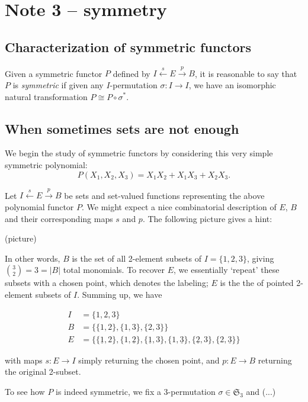 
\section{Note 3 -- symmetry}

\subsection{Characterization of symmetric functors}

Given a symmetric functor $P$ defined by $I \overset{s}{\gets} E \overset{p}{\to} B$, it is reasonable to say that $P$ is \emph{symmetric} if given any $I$-permutation $\sigma:I\to I$, we have an isomorphic natural transformation $P \cong P\circ \sigma^*$.

\subsection{When sometimes sets are not enough}

We begin the study of symmetric functors by considering this very simple symmetric polynomial:
\[
P(X_1,X_2,X_3) = X_1X_2 + X_1X_3 + X_2X_3.
\]

Let $I \overset{s}{\gets} E \overset{p}{\to} B$ be sets and set-valued functions representing the above polynomial functor $P$. We might expect a nice combinatorial description of $E$, $B$ and their corresponding maps $s$ and $p$. The following picture gives a hint:

(picture)

In other words, $B$ is the set of all 2-element subsets of $I=\{1,2,3\}$, giving $\binom{3}{2}=3=|B|$ total monomials. To recover $E$, we essentially `repeat' these subsets with a chosen point, which denotes the labeling; $E$ is the the of pointed 2-element subsets of $I$. Summing up, we have

\begin{align*}
I &= \{1,2,3\}\\
B &= \{\{1,2\},\{1,3\},\{2,3\}\}\\
E &= \{\{\underline{1},2\}, \{1,\underline{2}\}, \{\underline{1},3\}, \{1,\underline{3}\},\{\underline{2},3\}, \{2,\underline{3}\}\}
\end{align*}

with maps $s:E\to I$ simply returning the chosen point, and $p:E\to B$ returning the original 2-subset.

To see how $P$ is indeed symmetric, we fix a 3-permutation $\sigma\in\mathfrak{S}_3$ and (...)

